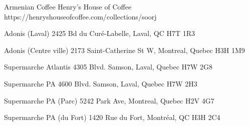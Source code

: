 Armenian Coffee
Henry's House of Coffee
https://henryshouseofcoffee.com/collections/soorj

Adonis (Laval)
2425 Bd du Curé-Labelle, Laval, QC H7T 1R3

Adonis (Centre ville)
2173 Saint-Catherine St W, Montreal, Quebec H3H 1M9

Supermarche Atlantis
4305 Blvd. Samson, Laval, Quebec H7W 2G8

Supermarche PA
4600 Blvd. Samson, Laval, Quebec H7W 2H3

Supermarche PA (Parc)
5242 Park Ave, Montreal, Quebec H2V 4G7

Supermarche PA (du Fort)
1420 Rue du Fort, Montréal, QC H3H 2C4
